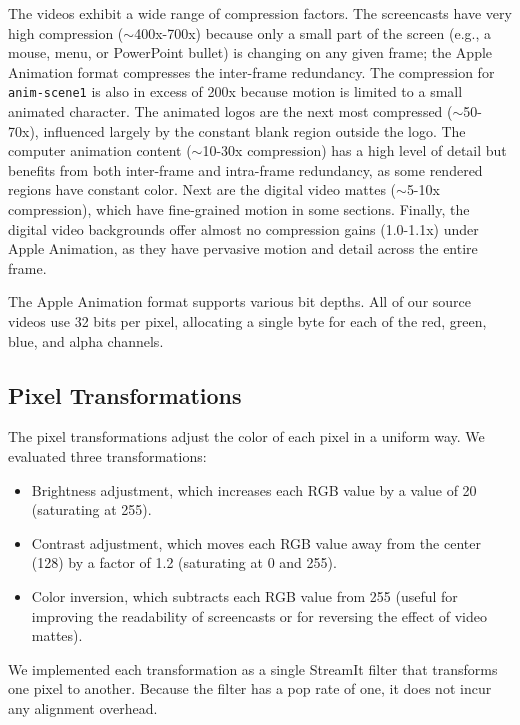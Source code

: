 The videos exhibit a wide range of compression factors.  The
screencasts have very high compression ($\sim$400x-700x) because only
a small part of the screen (e.g., a mouse, menu, or PowerPoint bullet)
is changing on any given frame; the Apple Animation format compresses
the inter-frame redundancy.  The compression for {\tt anim-scene1} is
also in excess of 200x because motion is limited to a small animated
character.  The animated logos are the next most compressed
($\sim$50-70x), influenced largely by the constant blank region
outside the logo.  The computer animation content ($\sim$10-30x
compression) has a high level of detail but benefits from both
inter-frame and intra-frame redundancy, as some rendered regions have
constant color.  Next are the digital video mattes ($\sim$5-10x
compression), which have fine-grained motion in some sections.
Finally, the digital video backgrounds offer almost no compression
gains (1.0-1.1x) under Apple Animation, as they have pervasive motion
and detail across the entire frame.

The Apple Animation format supports various bit depths.  All of our
source videos use 32 bits per pixel, allocating a single byte for each
of the red, green, blue, and alpha channels.

\subsection*{Pixel Transformations}

The pixel transformations adjust the color of each pixel in a uniform
way.  We evaluated three transformations:
\begin{itemize}
\item Brightness adjustment, which increases each RGB value by a value
of 20 (saturating at 255).
\item Contrast adjustment, which moves each RGB value away from the
center (128) by a factor of 1.2 (saturating at 0 and 255).

\item Color inversion, which subtracts each RGB value from 255 (useful
  for improving the readability of screencasts or for reversing the
  effect of video mattes).

\end{itemize}

We implemented each transformation as a single StreamIt filter that
transforms one pixel to another.  Because the filter has a pop rate of
one, it does not incur any alignment overhead.

